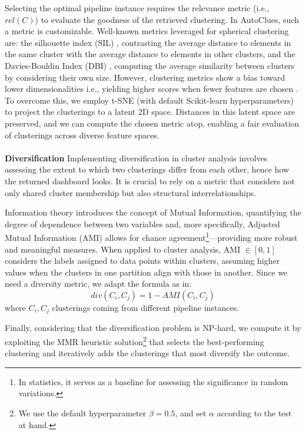 \documentclass[runningheads]{llncs}
\begin{document}
Selecting the optimal pipeline instance requires the relevance metric (i.e., $rel(C)$) to evaluate the goodness of the retrieved clustering.
In AutoClues, such a metric is customizable.
Well-known metrics leveraged for spherical clustering are: the silhouette index (SIL) \cite{zhu2010clustering}, contrasting the average distance to elements in the same cluster with the average distance to elements in other clusters, and the Davies-Bouldin Index (DBI) \cite{dbi}, computing the average similarity between clusters by considering their own size.
However, clustering metrics show a bias toward lower dimensionalities i.e., yielding higher scores when fewer features are chosen \cite{lensen2017using,hancer2020new}. 
To overcome this, we employ t-SNE \cite{van2008visualizing} (with default Scikit-learn hyperparameters) to project the clusterings to a latent 2D space.
Distances in this latent space are preserved, and we can compute the chosen metric atop,  enabling a fair evaluation of clusterings across diverse feature spaces.
%
\\
\\
\textbf{Diversification}
Implementing diversification in cluster analysis involves assessing the extent to which two clusterings differ from each other, hence how the returned dashboard looks.
It is crucial to rely on a metric that considers not only shared cluster membership but also structural interrelationships.

Information theory introduces the concept of Mutual Information, quantifying the degree of dependence between two variables and, more specifically, Adjusted Mutual Information (AMI) allows for chance agreement\footnote{In statistics, it serves as a baseline for assessing the significance in random variations.}---providing more robust and meaningful measures.
When applied to cluster analysis, AMI $\in [0, 1]$ considers the labels assigned to data points within clusters, assuming higher values when the clusters in one partition align with those in another.
Since we need a diversity metric, we adapt the formula as in:
$$div(C_i, C_j) = 1- AMI(C_i, C_j)$$ 
where $C_i, C_j$ clusterings coming from different pipeline instances.

Finally, considering that the diversification problem is NP-hard, we compute it by exploiting the MMR heuristic solution\footnote{We use the default hyperparameter $\beta = 0.5$, and set $\alpha$ according to the test at hand.} \cite{vieira2011query} that selects the best-performing clustering and iteratively adds the clusterings that most diversify the outcome.
\end{document}
